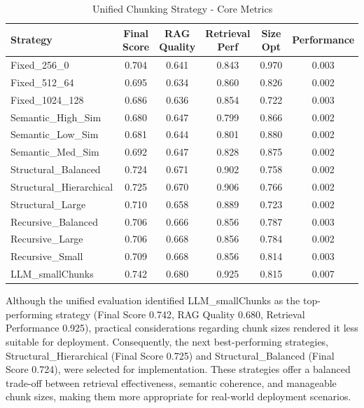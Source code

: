 \begin{table}[htbp]
	\centering
	\caption{Unified Chunking Strategy - Core Metrics}
	\begin{tabular}{lccccc}
		\hline
		\textbf{Strategy} & \textbf{Final Score} & \textbf{RAG Quality} & \textbf{Retrieval Perf} & \textbf{Size Opt} & \textbf{Performance} \\
		\hline
		Fixed\_256\_0         & 0.704 & 0.641 & 0.843 & 0.970 & 0.003 \\
		Fixed\_512\_64        & 0.695 & 0.634 & 0.860 & 0.826 & 0.002 \\
		Fixed\_1024\_128      & 0.686 & 0.636 & 0.854 & 0.722 & 0.003 \\
		Semantic\_High\_Sim   & 0.680 & 0.647 & 0.799 & 0.866 & 0.002 \\
		Semantic\_Low\_Sim    & 0.681 & 0.644 & 0.801 & 0.880 & 0.002 \\
		Semantic\_Med\_Sim    & 0.692 & 0.647 & 0.828 & 0.875 & 0.002 \\
		Structural\_Balanced  & 0.724 & 0.671 & 0.902 & 0.758 & 0.002 \\
		Structural\_Hierarchical & 0.725 & 0.670 & 0.906 & 0.766 & 0.002 \\
		Structural\_Large     & 0.710 & 0.658 & 0.889 & 0.723 & 0.002 \\
		Recursive\_Balanced   & 0.706 & 0.666 & 0.856 & 0.787 & 0.003 \\
		Recursive\_Large      & 0.706 & 0.668 & 0.856 & 0.784 & 0.002 \\
		Recursive\_Small      & 0.709 & 0.668 & 0.856 & 0.814 & 0.003 \\
		LLM\_smallChunks      & 0.742 & 0.680 & 0.925 & 0.815 & 0.007 \\
		\hline
	\end{tabular}
\end{table}


Although the unified evaluation identified LLM\_smallChunks as the top-performing strategy (Final Score 0.742, RAG Quality 0.680, Retrieval Performance 0.925), practical considerations regarding chunk sizes rendered it less suitable for deployment. Consequently, the next best-performing strategies, Structural\_Hierarchical (Final Score 0.725) and Structural\_Balanced (Final Score 0.724), were selected for implementation. These strategies offer a balanced trade-off between retrieval effectiveness, semantic coherence, and manageable chunk sizes, making them more appropriate for real-world deployment scenarios.


